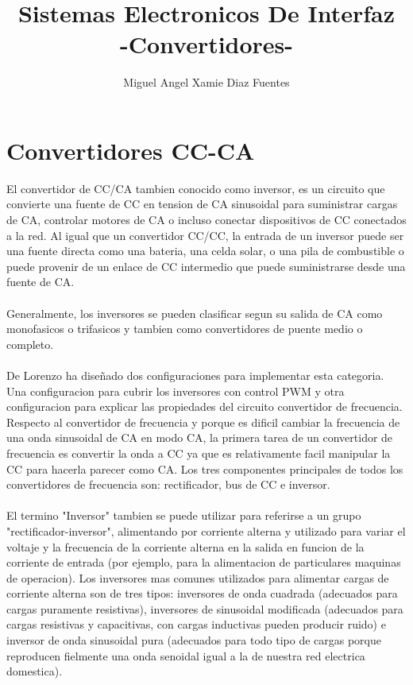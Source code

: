 \documentclass[11pt]{article}
\title{\textbf{Sistemas Electronicos De Interfaz\\-Convertidores-
}}
\author{Miguel Angel Xamie Diaz Fuentes}
\date{}
\begin{document}
\maketitle

\section{Convertidores CC-CA}
El convertidor de CC/CA tambien conocido como inversor, es un circuito que convierte una fuente de CC en tension de CA sinusoidal para suministrar cargas de CA, controlar motores de CA o incluso conectar dispositivos de CC conectados a la red. Al igual que un convertidor CC/CC, la entrada de un inversor puede ser una fuente directa como una bateria, una celda solar, o una pila de combustible o puede provenir de un enlace de CC intermedio que puede suministrarse desde una fuente de CA.\\\\ Generalmente, los inversores se pueden clasificar segun su salida de CA como monofasicos o trifasicos y tambien como convertidores de puente medio o completo.\\\\ De Lorenzo ha diseñado dos configuraciones para implementar esta categoria. Una configuracion para cubrir los inversores con control PWM y otra configuracion para explicar las propiedades del circuito convertidor de frecuencia.\\ Respecto al convertidor de frecuencia y porque es dificil cambiar la frecuencia de una onda sinusoidal de CA en modo CA, la primera tarea de un convertidor de frecuencia es convertir la onda a CC ya que es relativamente facil manipular la CC para hacerla parecer como CA. Los tres componentes principales de todos los convertidores de frecuencia son: rectificador, bus de CC e inversor.\\\\ 
El termino "Inversor" tambien se puede utilizar para referirse a un grupo "rectificador-inversor", alimentando por corriente alterna y utilizado para variar el voltaje y la frecuencia de la corriente alterna en la salida en funcion de la corriente de entrada (por ejemplo, para la alimentacion de particulares maquinas de operacion). Los inversores mas comunes utilizados para alimentar cargas de corriente alterna son de tres tipos: inversores de onda cuadrada (adecuados para cargas puramente resistivas), inversores de sinusoidal modificada (adecuados para cargas resistivas y capacitivas, con cargas inductivas pueden producir ruido) e inversor de onda sinusoidal pura (adecuados para todo tipo de cargas porque reproducen fielmente una onda senoidal igual a la de nuestra red electrica domestica).
\end{document}
